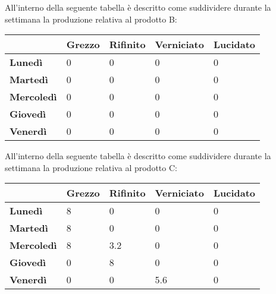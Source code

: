\documentclass[12pt]{article}
\begin{document}
All'interno della seguente tabella è descritto come suddividere durante la settimana la produzione relativa al prodotto B:
\begin{table}[H]
	\centering
	\setlength{\tabcolsep}{15pt} %
	\renewcommand{\arraystretch}{2} %
	\begin{center}
		\begin{tabular}{|l|l|l|l|l|}
			\hline
			& \textbf{Grezzo} & \textbf{Rifinito} & \textbf{Verniciato} & \textbf{Lucidato} \\ \hline
			\textbf{Lunedì}    & 0              & 0                 & 0                   & 0                 \\ \hline
			\textbf{Martedì}   & 0               & 0              & 0                   & 0                 \\ \hline
			\textbf{Mercoledì} & 0             & 0                 & 0             & 0                 \\ \hline
			\textbf{Giovedì}   & 0               & 0              & 0                   & 0                 \\ \hline
			\textbf{Venerdì}   & 0               & 0                 & 0               & 0                 \\ \hline
		\end{tabular}
	\end{center}
\end{table}

All'interno della seguente tabella è descritto come suddividere durante la settimana la produzione relativa al prodotto C:
\begin{table}[H]
	\centering
	\setlength{\tabcolsep}{15pt} %
	\renewcommand{\arraystretch}{2} %
	\begin{center}
		\begin{tabular}{|l|l|l|l|l|}
			\hline
			& \textbf{Grezzo} & \textbf{Rifinito} & \textbf{Verniciato} & \textbf{Lucidato} \\ \hline
			\textbf{Lunedì}    & 8               & 0                 & 0                   & 0                 \\ \hline
			\textbf{Martedì}   & 8               & 0              & 0                   & 0                 \\ \hline
			\textbf{Mercoledì} & 8             & 3.2                 & 0             & 0                 \\ \hline
			\textbf{Giovedì}   & 0               & 8              & 0                   & 0                 \\ \hline
			\textbf{Venerdì}   & 0               & 0                 & 5.6               & 0                 \\ \hline
		\end{tabular}
	\end{center}
\end{table}
\end{document}
